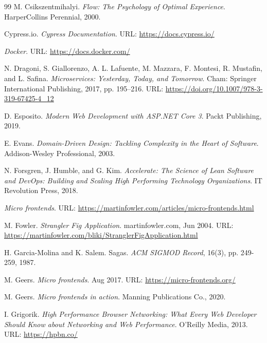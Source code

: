 \begin{thebibliography}{99}
    M. Csikszentmihalyi.
    \textit{Flow: The Psychology of Optimal Experience}.
    HarperCollins Perennial, 2000.

    Cypress.io.
    \textit{Cypress Documentation}.
    URL: \url{https://docs.cypress.io/}

    \textit{Docker}.
    URL: \url{https://docs.docker.com/}

    N. Dragoni, S. Giallorenzo, A. L. Lafuente, M. Mazzara, F. Montesi, R. Mustafin, and L. Safina.
    \textit{Microservices: Yesterday, Today, and Tomorrow}.
    Cham: Springer International Publishing, 2017, pp. 195–216.
    URL: \url{https://doi.org/10.1007/978-3-319-67425-4_12}

    D. Esposito.
    \textit{Modern Web Development with ASP.NET Core 3}.
    Packt Publishing, 2019.

    E. Evans.
    \textit{Domain-Driven Design: Tackling Complexity in the Heart of Software}.
    Addison-Wesley Professional, 2003.

    N. Forsgren, J. Humble, and G. Kim.
    \textit{Accelerate: The Science of Lean Software and DevOps: Building and Scaling High Performing Technology Organizations}.
    IT Revolution Press, 2018.
		
    \textit{Micro frontends}.
    URL: \url{https://martinfowler.com/articles/micro-frontends.html}

    M. Fowler.
    \textit{Strangler Fig Application}.
    martinfowler.com, Jun 2004.
    URL: \url{https://martinfowler.com/bliki/StranglerFigApplication.html}

    H. Garcia-Molina and K. Salem.
    Sagas. 
    \textit{ACM SIGMOD Record}, 16(3), pp. 249-259, 1987.
		
    M. Geers.
    \textit{Micro frontends}.
    Aug 2017.
    URL: \url{https://micro-frontends.org/}

    M. Geers.
    \textit{Micro frontends in action}.
    Manning Publications Co., 2020.

    I. Grigorik.
    \textit{High Performance Browser Networking: What Every Web Developer Should Know about Networking and Web Performance}.
    O'Reilly Media, 2013.
    URL: \url{https://hpbn.co/}


\end{thebibliography}
